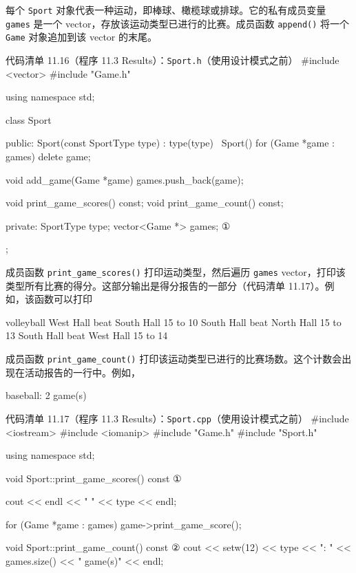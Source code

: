 每个 \texttt{Sport} 对象代表一种运动，即棒球、橄榄球或排球。它的私有成员变量 \texttt{games} 是一个 vector，存放该运动类型已进行的比赛。成员函数 \texttt{append()} 将一个 \texttt{Game} 对象追加到该 vector 的末尾。

\begin{codeboxt}{代码清单 11.16（程序 11.3 Results）：\texttt{Sport.h}（使用设计模式之前）}
#include <vector>
#include "Game.h"

using namespace std;

class Sport
{
public:
    Sport(const SportType type) : type(type) {}
    ~Sport() { for (Game *game : games) delete game; }

    void add_game(Game *game) { games.push_back(game); }

    void print_game_scores() const;
    void print_game_count()  const;

private:
    SportType type;
    vector<Game *> games;    ①
};
\end{codeboxt}
\par

成员函数 \texttt{print\_\allowbreak{}game\_\allowbreak{}scores(\allowbreak{})\allowbreak{}} 打印运动类型，然后遍历 \texttt{games} vector，打印该类型所有比赛的得分。这部分输出是得分报告的一部分（代码清单 11.17）。例如，该函数可以打印

\begin{codebox}
  volleyball
     West Hall beat South Hall 15 to 10
    South Hall beat North Hall 15 to 13
    South Hall beat  West Hall 15 to 14
\end{codebox}

成员函数 \texttt{print\_\allowbreak{}game\_\allowbreak{}count(\allowbreak{})\allowbreak{}} 打印该运动类型已进行的比赛场数。这个计数会出现在活动报告的一行中。例如，

\begin{codebox}
    baseball: 2 game(s)
\end{codebox}

\begin{codeboxt}{代码清单 11.17（程序 11.3 Results）：\texttt{Sport.cpp}（使用设计模式之前）}
#include <iostream>
#include <iomanip>
#include "Game.h"
#include "Sport.h"

using namespace std;

void Sport::print_game_scores() const     ①
{
    cout << endl << "  " << type << endl;

    for (Game *game : games) game->print_game_score();
}

void Sport::print_game_count() const      ②
{
    cout << setw(12) << type << ": "
         << games.size() << " game(s)" << endl;
}
\end{codeboxt}
\par
{}\par

